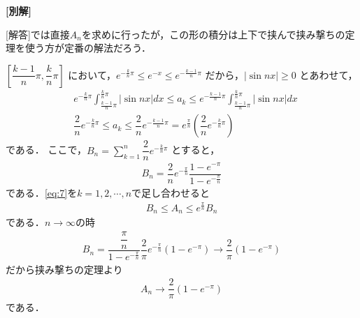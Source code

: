 \documentclass[../../main.tex]{subfiles}
\begin{document}
{\bf [別解]}

[解答]では直接$A_n$を求めに行ったが，この形の積分は上下で挟んで挟み撃ちの定理を使う方が定番の解法だろう．

$[\dfrac{k-1}{n}\pi, \dfrac{k}{n}\pi]$ において，$e^{-\frac{k}{n}\pi} \le e^{-x} \le e^{-\frac{k-1}{n}\pi}$ だから，$|\sin nx| \ge 0$ とあわせて，
\begin{align}
  & e^{-\frac{k}{n}\pi} \int_{\frac{k-1}{n}\pi}^{\frac{k}{n}\pi} |\sin nx| dx \le a_k \le e^{-\frac{k-1}{n}\pi} \int_{\frac{k-1}{n}\pi}^{\frac{k}{n}\pi} |\sin nx| dx \\
  & \dfrac{2}{n} e^{-\frac{k}{n}\pi} \le a_k \le \dfrac{2}{n} e^{-\frac{k-1}{n}\pi} = e^{\frac{\pi}{n}} \left( \dfrac{2}{n} e^{-\frac{k}{n}\pi} \right) \label{eq:7}
\end{align}
である．
ここで，$B_n = \sum_{k=1}^n \dfrac{2}{n} e^{-\frac{k}{n}\pi}$ とすると，
\begin{align}
  B_n = \dfrac{2}{n} e^{-\frac{\pi}{n}} \dfrac{1-e^{-\pi}}{1-e^{-\frac{\pi}{n}}}
\end{align}
である．\cref{eq:7}を$k=1,2,\cdots,n$で足し合わせると
\begin{align}
  B_n \le A_n \le e^{\frac{\pi}{n}} B_n
\end{align}
である．$n\to\infty$の時
\begin{align}
  B_n = \dfrac{\dfrac{\pi}{n}}{1-e^{-\frac{\pi}{n}}} \dfrac{2}{\pi} e^{-\frac{\pi}{n}} (1-e^{-\pi}) \to \dfrac{2}{\pi}(1-e^{-\pi})
\end{align}
だから挟み撃ちの定理より
\begin{align}
  A_n \to \dfrac{2}{\pi}(1-e^{-\pi})
\end{align}
である．
\end{document}

